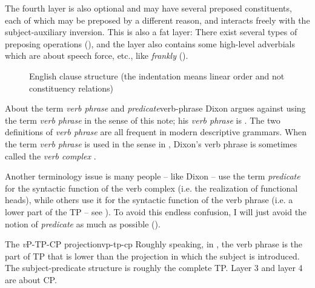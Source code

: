 \documentclass[UTF8, a4paper, oneside, scheme=plain]{ctexrep}
\newcommand*{\term}[1]{\emph{#1}}
\newcommand{\corpus}[1]{\emph{#1}}
\newcommand{\vP}{\textit{v}P}
\begin{document}
The fourth layer is also optional and may have several preposed constituents,
each of which may be preposed by a different reason,
and interacts freely with the subject-auxiliary inversion.
This is also a fat layer:
There exist several types of preposing operations (),
and the layer also contains some high-level adverbials
which are about speech force, etc., %
like \corpus{frankly} ().

\begin{figure}[H]
    \centering
    
    \caption{English clause structure (the indentation means linear order and not constituency relations)}
    \label{fig:clause-template}
\end{figure}

\begin{infobox}{About the term \term{verb phrase} and \term{predicate}}{verb-phrase}
    Dixon argues against using the term \term{verb phrase} in the sense of this note;
    his \term{verb phrase} is .
    The two definitions of \term{verb phrase} are all frequent in modern descriptive grammars.
    When the term \term{verb phrase} is used in the sense in ,
    Dixon's verb phrase is sometimes called the \term{verb complex} \citep{Friesen2017}.

    Another terminology issue is many people -- like Dixon -- use the term \term{predicate}
    for the syntactic function of the verb complex
    (i.e. the realization of functional heads),
    while others use it for the syntactic function of the verb phrase 
    (i.e. a lower part of the TP -- see ).
    To avoid this endless confusion, 
    I will just avoid the notion of \term{predicate} as much as possible ().
\end{infobox}

\begin{theorybox}{The \vP{}-TP-CP projection}{vp-tp-cp}
    Roughly speaking, in ,
    the verb phrase is the part of TP that is lower than the projection in which the subject is introduced.
    The subject-predicate structure is roughly the complete TP.
    Layer 3 and layer 4 are about CP.
\end{theorybox}
\end{document}
